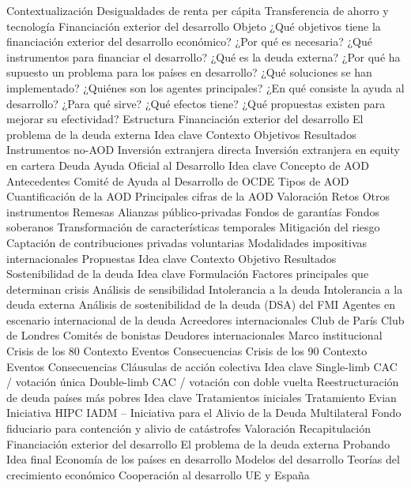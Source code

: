 \documentclass{nuevotema}
\begin{document}
\begin{esquema}[enumerate]
	\1[] 
		\2 Contextualización
			\3 Desigualdades de renta per cápita
			\3 Transferencia de ahorro y tecnología
			\3 Financiación exterior del desarrollo
		\2 Objeto
			\3 ¿Qué objetivos tiene la financiación exterior del desarrollo económico?
			\3 ¿Por qué es necesaria?
			\3 ¿Qué instrumentos para financiar el desarrollo?
			\3 ¿Qué es la deuda externa?
			\3 ¿Por qué ha supuesto un problema para los países en desarrollo?
			\3 ¿Qué soluciones se han implementado?
			\3 ¿Quiénes son los agentes principales?
			\3 ¿En qué consiste la ayuda al desarrollo?
			\3 ¿Para qué sirve?
			\3 ¿Qué efectos tiene?
			\3 ¿Qué propuestas existen para mejorar su efectividad?
		\2 Estructura
			\3 Financiación exterior del desarrollo
			\3 El problema de la deuda externa
	\1 
		\2 Idea clave
			\3 Contexto
			\3 Objetivos
			\3 Resultados
		\2 Instrumentos no-AOD
			\3 Inversión extranjera directa
			\3 Inversión extranjera en equity en cartera
			\3 Deuda
		\2 Ayuda Oficial al Desarrollo
			\3 Idea clave
			\3 Concepto de AOD
			\3 Antecedentes
			\3 Comité de Ayuda al Desarrollo de OCDE
			\3 Tipos de AOD
			\3 Cuantificación de la AOD
			\3 Principales cifras de la AOD
			\3 Valoración
			\3 Retos
		\2 Otros instrumentos
			\3 Remesas
			\3 Alianzas público-privadas
			\3 Fondos de garantías
			\3 Fondos soberanos
			\3 Transformación de características temporales
			\3 Mitigación del riesgo
			\3 Captación de contribuciones privadas voluntarias
			\3 Modalidades impositivas internacionales
			\3 Propuestas
	\1 
		\2 Idea clave
			\3 Contexto
			\3 Objetivo
			\3 Resultados
		\2 Sostenibilidad de la deuda
			\3 Idea clave
			\3 Formulación
			\3 Factores principales que determinan crisis
			\3 Análisis de sensibilidad
			\3 Intolerancia a la deuda
			\3 Intolerancia a la deuda externa
			\3 Análisis de sostenibilidad de la deuda (DSA) del FMI
		\2 Agentes en escenario internacional de la deuda
			\3 Acreedores internacionales
			\3 Club de París
			\3 Club de Londres
			\3 Comités de bonistas
			\3 Deudores internacionales
			\3 Marco institucional
		\2 Crisis de los 80
			\3 Contexto
			\3 Eventos
			\3 Consecuencias
		\2 Crisis de los 90
			\3 Contexto
			\3 Eventos
			\3 Consecuencias
		\2 Cláusulas de acción colectiva
			\3 Idea clave
			\3 Single-limb CAC / votación única
			\3 Double-limb CAC / votación con doble vuelta
		\2 Reestructuración de deuda países más pobres
			\3 Idea clave
			\3 Tratamientos iniciales
			\3 Tratamiento Evian
			\3 Iniciativa HIPC
			\3 IADM -- Iniciativa para el Alivio de la Deuda Multilateral
			\3 Fondo fiduciario para contención y alivio de catástrofes
			\3 Valoración
	\1[] 
		\2 Recapitulación
			\3 Financiación exterior del desarrollo
			\3 El problema de la deuda externa
			\3 Probando
		\2 Idea final
			\3 Economía de los países en desarrollo
			\3 Modelos del desarrollo
			\3 Teorías del crecimiento económico
			\3 Cooperación al desarrollo UE y España

\end{esquema}
\end{document}
